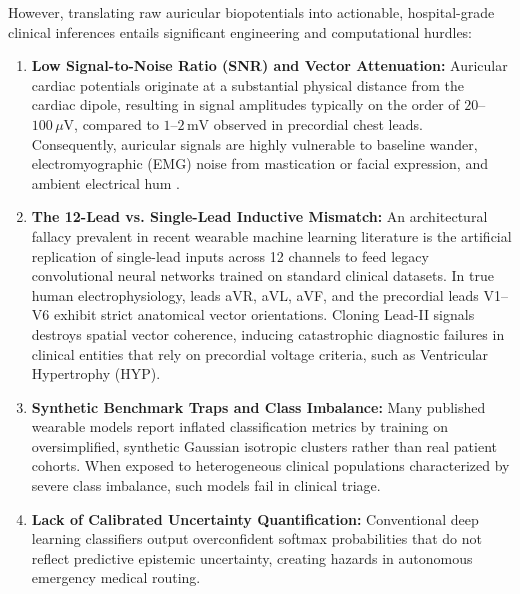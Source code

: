 However, translating raw auricular biopotentials into actionable, hospital-grade clinical inferences entails significant engineering and computational hurdles:
\begin{enumerate}
    \item \textbf{Low Signal-to-Noise Ratio (SNR) and Vector Attenuation:} Auricular cardiac potentials originate at a substantial physical distance from the cardiac dipole, resulting in signal amplitudes typically on the order of $20$--$100\,\mu\text{V}$, compared to $1$--$2\,\text{mV}$ observed in precordial chest leads. Consequently, auricular signals are highly vulnerable to baseline wander, electromyographic (EMG) noise from mastication or facial expression, and ambient electrical hum \cite{Clifford2012}.
    \item \textbf{The 12-Lead vs. Single-Lead Inductive Mismatch:} An architectural fallacy prevalent in recent wearable machine learning literature is the artificial replication of single-lead inputs across 12 channels to feed legacy convolutional neural networks trained on standard clinical datasets. In true human electrophysiology, leads aVR, aVL, aVF, and the precordial leads V1--V6 exhibit strict anatomical vector orientations. Cloning Lead-II signals destroys spatial vector coherence, inducing catastrophic diagnostic failures in clinical entities that rely on precordial voltage criteria, such as Ventricular Hypertrophy (HYP).
    \item \textbf{Synthetic Benchmark Traps and Class Imbalance:} Many published wearable models report inflated classification metrics by training on oversimplified, synthetic Gaussian isotropic clusters rather than real patient cohorts. When exposed to heterogeneous clinical populations characterized by severe class imbalance, such models fail in clinical triage.
    \item \textbf{Lack of Calibrated Uncertainty Quantification:} Conventional deep learning classifiers output overconfident softmax probabilities that do not reflect predictive epistemic uncertainty, creating hazards in autonomous emergency medical routing.
\end{enumerate}

